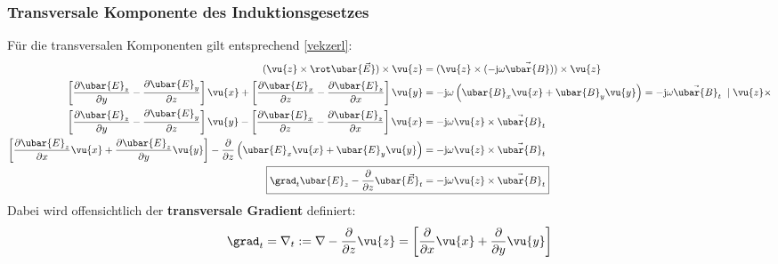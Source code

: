 \subsubsection{Transversale Komponente des Induktionsgesetzes}
	 Für die transversalen Komponenten gilt entsprechend \ref{vekzerl}:
	\begin{align}
		(\vu{z}\times\rot \ubar{\vec{E}})\times\vu{z}                                                                                                                                                                         & = (\vu{z}\times(-\mathrm{j}\omega\vec{\ubar{B}}))\times\vu{z}                                                                     \nonumber\\
		\left[ \frac{\partial \ubar{E}_{z}}{\partial y} - \frac{\partial \ubar{E}_{y}}{\partial z} \right] \vu{x} + \left[ \frac{\partial \ubar{E}_{x}}{\partial z} - \frac{\partial \ubar{E}_{z}}{\partial x} \right] \vu{y} & = -\mathrm{j}\omega \left(\ubar{B}_x \vu{x} + \ubar{B}_y \vu{y} \right) = -\mathrm{j}\omega \vec{\ubar{B}}_t \;\;|\; \vu{z}\times \nonumber\\
		\left[ \frac{\partial \ubar{E}_{z}}{\partial y} - \frac{\partial \ubar{E}_{y}}{\partial z} \right] \vu{y} - \left[ \frac{\partial \ubar{E}_{x}}{\partial z} - \frac{\partial \ubar{E}_{z}}{\partial x} \right] \vu{x} & = -\mathrm{j}\omega \vu{z}\times \vec{\ubar{B}}_t                                                                                 \nonumber\\
		\left[ \frac{\partial \ubar{E}_{z}}{\partial x} \vu{x} + \frac{\partial \ubar{E}_{z}}{\partial y} \vu{y} \right] - \frac{\partial}{\partial z}\left(\ubar{E}_{x}\vu{x} + \ubar{E}_{y}\vu{y} \right)                   & = -\mathrm{j}\omega \vu{z}\times \vec{\ubar{B}}_t                                                                                 \nonumber\\
		\Aboxed{\grad _t \ubar{E}_{z} - \frac{\partial}{\partial z}\ubar{\vec{E}}_t                                                                                                                                           & = -\mathrm{j}\omega \vu{z}\times \vec{\ubar{B}}_t} \label{transind}
	\end{align}
	Dabei wird offensichtlich der \textbf{transversale Gradient} definiert:
	\begin{equation}
		\grad_t=\nabla_t:= \nabla-\frac{\partial }{\partial z} \vu{z}=\left[ \frac{\partial }{\partial x} \vu{x} + \frac{\partial }{\partial y} \vu{y} \right]
	\end{equation}
